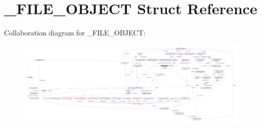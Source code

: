 \hypertarget{struct__FILE__OBJECT}{}\section{\+\_\+\+F\+I\+L\+E\+\_\+\+O\+B\+J\+E\+C\+T Struct Reference}
\label{struct__FILE__OBJECT}


Collaboration diagram for \+\_\+\+F\+I\+L\+E\+\_\+\+O\+B\+J\+E\+C\+T\+:
\nopagebreak
\begin{figure}[H]
\begin{center}
\leavevmode
\includegraphics[width=350pt]{struct__FILE__OBJECT__coll__graph}
\end{center}
\end{figure}

